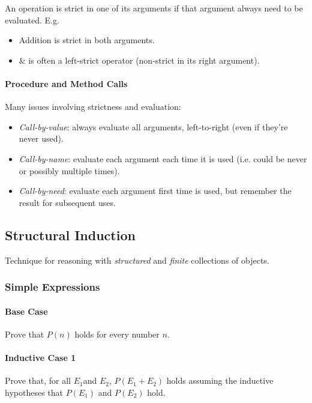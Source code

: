 \documentclass[twocolumn,english]{article}
\begin{document}
An operation is strict in one of its arguments if that argument always
need to be evaluated. E.g.
\begin{itemize}
\item Addition is strict in both arguments.
\item \texttt{$\&$} is often a left-strict operator (non-strict in its
right argument).
\end{itemize}

\paragraph{Procedure and Method Calls}

Many issues involving strictness and evaluation:
\begin{itemize}
\item \emph{Call-by-value}: always evaluate all arguments, left-to-right
(even if they're never used).
\item \emph{Call-by-name}: evaluate each argument each time it is used (i.e.
could be never or possibly multiple times).
\item \emph{Call-by-need}: evaluate each argument first time is used, but
remember the result for subsequent uses.
\end{itemize}

\subsection{Structural Induction}

Technique for reasoning with \emph{structured} and \emph{finite} collections
of objects.

\subsubsection{Simple Expressions}

\paragraph{Base Case}

Prove that $P(n)$ holds for every number $n$.

\paragraph{Inductive Case 1}

Prove that, for all $E_{1}$and $E_{2}$, $P\left(E_{1}+E_{2}\right)$
holds assuming the inductive hypotheses that $P\left(E_{1}\right)$
and $P\left(E_{2}\right)$ hold.
\end{document}

